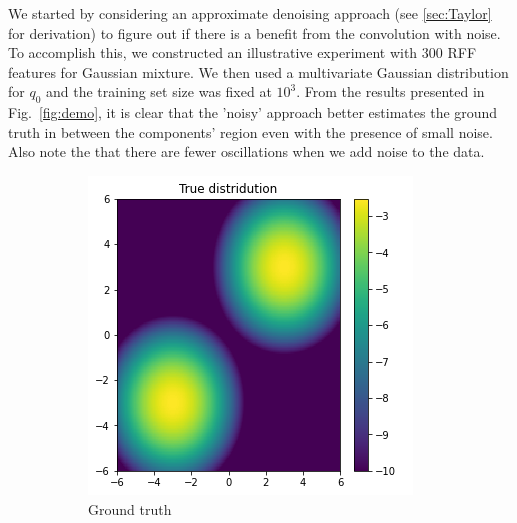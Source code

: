 We started by considering an approximate denoising approach (see \ref{sec:Taylor} for derivation)
to figure out if there is a benefit from the convolution with noise.
To accomplish this, we constructed an illustrative experiment with $300$ RFF
features for Gaussian mixture.
We then used a multivariate Gaussian distribution for $q_0$
and the training set size was fixed at $10^3$.
From the results presented in Fig.~\ref{fig:demo}, it is clear that the 'noisy' approach better estimates the ground truth in between the components'
region even with the presence of small noise.
Also note the that there are fewer oscillations when we add noise to the data.
\begin{figure}[!ht]
  \centering
  \begin{subfigure}[b]{0.32\textwidth}
    \includegraphics[width=\textwidth]{figures/score_matching/exps/taylor_MoG_true.png}
    \captionsetup{justification=centering}
    \caption{Ground truth\\ \hfill}
    \label{sfig:MoGtrue}
  \end{subfigure}
  \begin{subfigure}[b]{0.32\textwidth}

\end{subfigure}
\end{figure}
